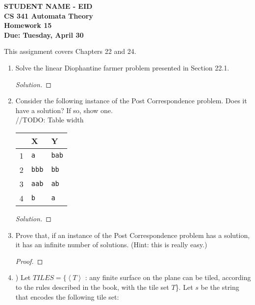 \documentclass[10pt]{article}
\newcommand{\brackets}[1]{\left< #1 \right>}
\begin{document}
\begin{flushleft}
\textbf{\noindent
STUDENT NAME - EID\\
CS 341 Automata Theory \\
Homework 15 \\
Due: Tuesday, April 30}\\
\end{flushleft}

\noindent
This assignment covers Chapters 22 and 24.\\

\begin{enumerate}[1)]


\item
Solve the linear Diophantine farmer problem presented in Section 22.1.
\begin{proof}[Solution]
\end{proof}


\item
Consider the following instance of the Post Correspondence problem.  Does it have a solution?  If so, show one.\\

//TODO: Table width

\begin{tabular}{| l | l | l |}
  \hline
  &X&Y\\
  \hline
  1&\texttt{a}&\texttt{bab}\\
  \hline
  2&\texttt{bbb}&\texttt{bb}\\
  \hline
  3&\texttt{aab}&\texttt{ab}\\
  \hline
  4&\texttt{b}&\texttt{a}\\
  \hline
\end{tabular}
\begin{proof}[Solution]
\end{proof}


\item
Prove that, if an instance of the Post Correspondence problem has a solution, it has an infinite number of solutions. (Hint: this is really easy.)
\begin{proof}[Proof]
\end{proof}


\item
) Let $TILES = \{\brackets{T}$ : any finite surface on the plane can be tiled, according to the rules described in the book, with the tile set $T$\}.  Let $s$ be the string that encodes the following tile set:\\


\end{enumerate}
\end{document}
